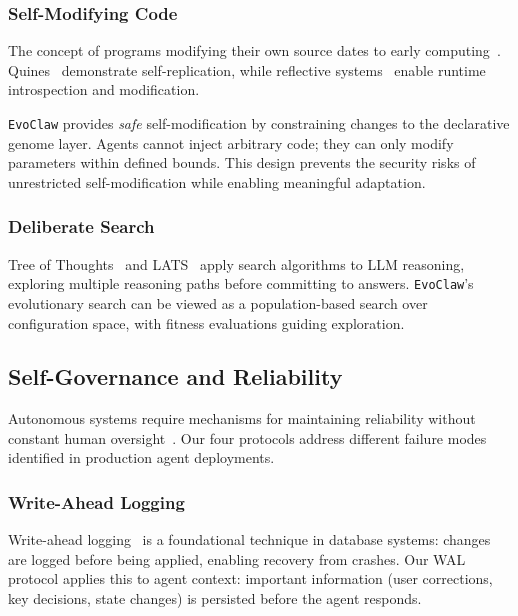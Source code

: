 \documentclass{article}
\newcommand{\evoclaw}{\texttt{EvoClaw}\xspace}
\begin{document}
\subsubsection{Self-Modifying Code}

The concept of programs modifying their own source dates to early computing~\cite{vonneumann1966self}. Quines~\cite{quine_thompson} demonstrate self-replication, while reflective systems~\cite{smith1984reflection} enable runtime introspection and modification.

\evoclaw{} provides \textit{safe} self-modification by constraining changes to the declarative genome layer. Agents cannot inject arbitrary code; they can only modify parameters within defined bounds. This design prevents the security risks of unrestricted self-modification while enabling meaningful adaptation.

\subsubsection{Deliberate Search}

Tree of Thoughts~\cite{yao2023tree} and LATS~\cite{zhou2023lats} apply search algorithms to LLM reasoning, exploring multiple reasoning paths before committing to answers. \evoclaw{}'s evolutionary search can be viewed as a population-based search over configuration space, with fitness evaluations guiding exploration.

\subsection{Self-Governance and Reliability}

Autonomous systems require mechanisms for maintaining reliability without constant human oversight~\cite{rushby1995critical}. Our four protocols address different failure modes identified in production agent deployments.

\subsubsection{Write-Ahead Logging}

Write-ahead logging~\cite{hewitt1976implementation} is a foundational technique in database systems: changes are logged before being applied, enabling recovery from crashes. Our WAL protocol applies this to agent context: important information (user corrections, key decisions, state changes) is persisted before the agent responds.
\end{document}
